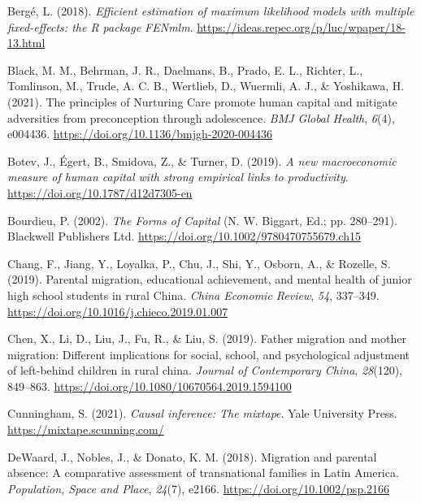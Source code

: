 \documentclass[
  man,floatsintext]{apa7}
\newlength{\cslhangindent}
\newlength{\cslentryspacingunit} %
\newenvironment{CSLReferences}[2] %
 {%
  \setlength{\parindent}{0pt}
  \ifodd #1
  \let\oldpar\par
  \def\par{\hangindent=\cslhangindent\oldpar}
  \fi
  \setlength{\parskip}{#2\cslentryspacingunit}
 }%
 {}
\begin{document}
\begin{CSLReferences}{1}{0}
\leavevmode{}%
Bergé, L. (2018). \emph{Efficient estimation of maximum likelihood models with multiple fixed-effects: the R package FENmlm}. \url{https://ideas.repec.org/p/luc/wpaper/18-13.html}

\leavevmode{}%
Black, M. M., Behrman, J. R., Daelmans, B., Prado, E. L., Richter, L., Tomlinson, M., Trude, A. C. B., Wertlieb, D., Wuermli, A. J., \& Yoshikawa, H. (2021). The principles of Nurturing Care promote human capital and mitigate adversities from preconception through adolescence. \emph{BMJ Global Health}, \emph{6}(4), e004436. \url{https://doi.org/10.1136/bmjgh-2020-004436}

\leavevmode{}%
Botev, J., Égert, B., Smidova, Z., \& Turner, D. (2019). \emph{A new macroeconomic measure of human capital with strong empirical links to productivity}. \url{https://doi.org/10.1787/d12d7305-en}

\leavevmode{}%
Bourdieu, P. (2002). \emph{The Forms of Capital} (N. W. Biggart, Ed.; pp. 280--291). Blackwell Publishers Ltd. \url{https://doi.org/10.1002/9780470755679.ch15}

\leavevmode{}%
Chang, F., Jiang, Y., Loyalka, P., Chu, J., Shi, Y., Osborn, A., \& Rozelle, S. (2019). Parental migration, educational achievement, and mental health of junior high school students in rural China. \emph{China Economic Review}, \emph{54}, 337--349. \url{https://doi.org/10.1016/j.chieco.2019.01.007}

\leavevmode{}%
Chen, X., Li, D., Liu, J., Fu, R., \& Liu, S. (2019). Father migration and mother migration: Different implications for social, school, and psychological adjustment of left-behind children in rural china. \emph{Journal of Contemporary China}, \emph{28}(120), 849--863. \url{https://doi.org/10.1080/10670564.2019.1594100}

\leavevmode{}%
Cunningham, S. (2021). \emph{Causal inference: The mixtape}. Yale University Press. \url{https://mixtape.scunning.com/}

\leavevmode{}%
DeWaard, J., Nobles, J., \& Donato, K. M. (2018). Migration and parental absence: A comparative assessment of transnational families in Latin America. \emph{Population, Space and Place}, \emph{24}(7), e2166. \url{https://doi.org/10.1002/psp.2166}


\end{CSLReferences}
\end{document}
